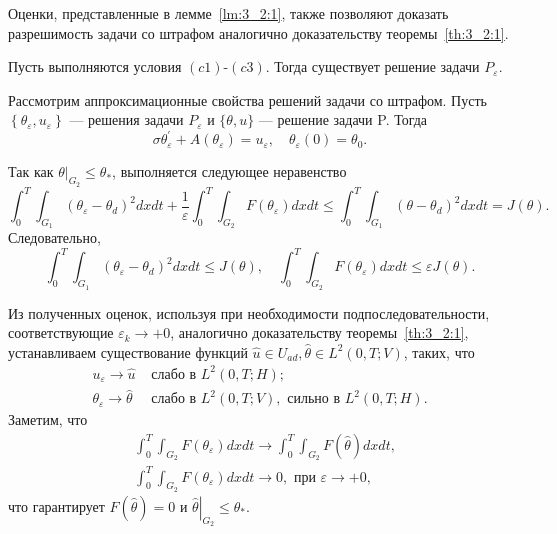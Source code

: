 Оценки, представленные в лемме~\ref{lm:3_2:1}, также позволяют доказать разрешимость
задачи со штрафом аналогично доказательству теоремы~\ref{th:3_2:1}.

\begin{theorem}
    \label{th:3_2:2}
    Пусть выполняются условия $(c1)$-$(c3)$.
    Тогда существует решение задачи $P_{\varepsilon}$.
\end{theorem}

Рассмотрим аппроксимационные свойства решений задачи со штрафом.
Пусть $\left\{\theta_{\varepsilon}, u_{\varepsilon}\right\}$ — решения задачи
$P_{\varepsilon}$ и $\{\theta, u\}$ — решение задачи P.
Тогда
\begin{equation}
    \label{eq:3_2:8}
    \sigma \theta_{\varepsilon}^{\prime}
    +A\left(\theta_{\varepsilon}\right)=u_{\varepsilon},
    \quad \theta_{\varepsilon}(0)=\theta_{0}.
\end{equation}

Так как $\left.\theta\right|_{G_{2}} \leq \theta_{*}$, выполняется следующее неравенство
\[
    \int_{0}^{T} \int_{G_{1}}\left(\theta_{\varepsilon}
    -\theta_{d}\right)^{2} d x d t+\frac{1}{\varepsilon}
    \int_{0}^{T} \int_{G_{2}}
    F\left(\theta_{\varepsilon}\right) d x d t
    \leq \int_{0}^{T} \int_{G_{1}}
    \left(\theta-\theta_{d}\right)^{2} d x d t=J(\theta).
\]
Следовательно,
\[
        \int_{0}^{T} \int_{G_{1}}\left(\theta_{\varepsilon}
        -\theta_{d}\right)^{2} d x d t \leq J(\theta), \quad
        \int_{0}^{T} \int_{G_{2}} F
        \left(\theta_{\varepsilon}\right) d x d t \leq \varepsilon J(\theta).
\]


Из полученных оценок, используя при необходимости подпоследовательности,
соответствующие $\varepsilon_{k} \rightarrow+0$,
аналогично доказательству теоремы~\ref{th:3_2:1}, устанавливаем существование
функций $\widehat{u} \in U_{a d}, \widehat{\theta} \in L^{2}(0, T ; V)$, таких, что
\[
    \begin{aligned}
        u_{\varepsilon}  \rightarrow \widehat{u} & \text { слабо в } L^{2}(0, T ; H); \\
        \theta_{\varepsilon}  \rightarrow \widehat{\theta} & \text { слабо в } L^{2}(0, T ; V),
        \text { сильно в } L^{2}(0, T; H).
    \end{aligned}
\]
Заметим, что
\[
    \begin{aligned}
        &\int_{0}^{T} \int_{G_{2}} F\left(\theta_{\varepsilon}\right) d x d t
        \rightarrow \int_{0}^{T} \int_{G_{2}} F(\widehat{\theta}) d x d t, \\
        &\int_{0}^{T} \int_{G_{2}} F\left(\theta_{\varepsilon}\right) d x d t
        \rightarrow 0, \text { при } \varepsilon \rightarrow+0,
    \end{aligned}
\]
что гарантирует $F(\widehat{\theta})=0$ и
$\left.\widehat{\theta}\right|_{G_{2}} \leq \theta_{*}$.

